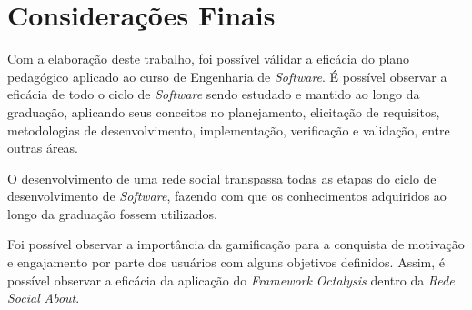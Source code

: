 \chapter[Considerações Finais]{Considerações Finais}

Com a elaboração deste trabalho, foi possível válidar
a eficácia do plano pedagógico aplicado ao curso de Engenharia de \textit{Software}.
É possível observar a eficácia de todo o ciclo de \textit{Software}
sendo estudado e mantido ao longo da graduação, aplicando seus conceitos
no planejamento, elicitação de requisitos, metodologias de desenvolvimento,
implementação, verificação e validação, entre outras áreas.

O desenvolvimento de uma rede social transpassa todas as etapas do
ciclo de desenvolvimento de \textit{Software}, fazendo com que os conhecimentos
adquiridos ao longo da graduação fossem utilizados.

Foi possível observar a importância da gamificação para a conquista
de motivação e engajamento por parte dos usuários com alguns objetivos
definidos. Assim, é possível observar a eficácia da aplicação do \textit{Framework}
\textit{Octalysis} dentro da \textit{Rede} \textit{Social} \textit{About}.
